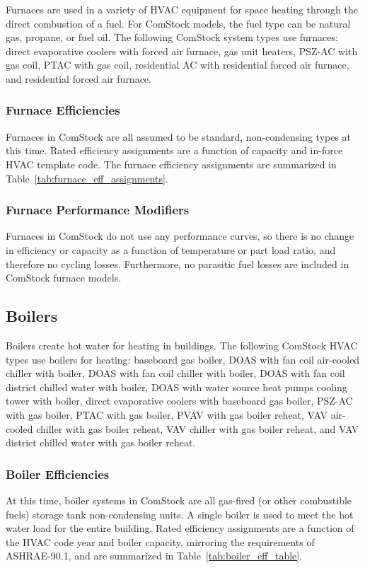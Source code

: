 Furnaces are used in a variety of HVAC equipment for space heating through the direct combustion of a fuel. For ComStock models, the fuel type can be natural gas, propane, or fuel oil. The following ComStock system types use furnaces: direct evaporative coolers with forced air furnace, gas unit heaters, PSZ-AC with gas coil, PTAC with gas coil, residential AC with residential forced air furnace, and residential forced air furnace.

\subsubsection{Furnace Efficiencies}

Furnaces in ComStock are all assumed to be standard, non-condensing types at this time. Rated efficiency assignments are a function of capacity and in-force HVAC template code. The furnace efficiency assignments are summarized in Table~\ref{tab:furnace_eff_assignments}.

\subsubsection{Furnace Performance Modifiers}

Furnaces in ComStock do not use any performance curves, so there is no change in efficiency or capacity as a function of temperature or part load ratio, and therefore no cycling losses. Furthermore, no parasitic fuel losses are included in ComStock furnace models.



\subsection{Boilers}

Boilers create hot water for heating in buildings. The following ComStock HVAC types use boilers for heating: baseboard gas boiler, DOAS with fan coil air-cooled chiller with boiler, DOAS with fan coil chiller with boiler, DOAS with fan coil district chilled water with boiler, DOAS with water source heat pumps cooling tower with boiler, direct evaporative coolers with baseboard gas boiler, PSZ-AC with gas boiler, PTAC with gas boiler, PVAV with gas boiler reheat, VAV air-cooled chiller with gas boiler reheat, VAV chiller with gas boiler reheat, and VAV district chilled water with gas boiler reheat.         

\subsubsection{Boiler Efficiencies}
At this time, boiler systems in ComStock are all gas-fired (or other combustible fuels) storage tank non-condensing units. A single boiler is used to meet the hot water load for the entire building. Rated efficiency assignments are a function of the HVAC code year and boiler capacity, mirroring the requirements of ASHRAE-90.1, and are summarized in Table~\ref{tab:boiler_eff_table}. 


